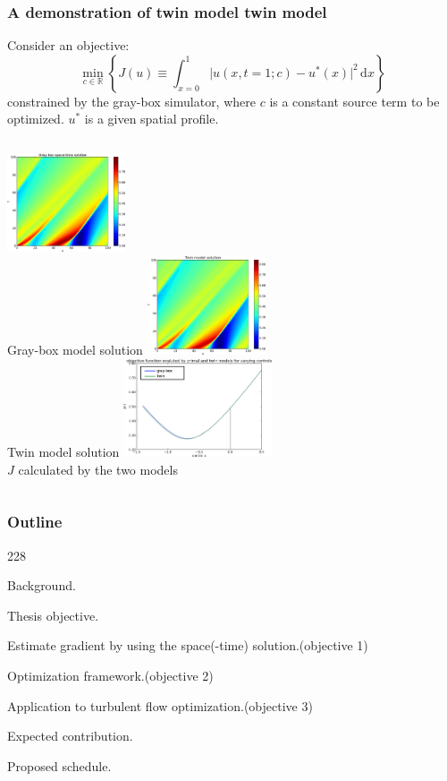 \documentclass{beamer}
\let\oldcite=\cite
\renewcommand{\cite}[1]{\textcolor[rgb]{.4,.4,.85}{\oldcite{#1}}}
\newcommand{\barrow}{\item[\color{darkred}\ding{228}]}
\begin{document}
\begin{frame}
    \frametitle{A demonstration of twin model \hfill \scriptsize{twin model}}\small
    Consider an objective: \scriptsize \cite{Kucuk 06}\vspace{-.2cm}\small
    $$
        \min_{c\in\mathbb{R}} \left\{ J(u) \equiv \int_{x=0}^1 \big|u(x,t=1;c) - u^*(x)\big|^2 \,\textrm{d}x\right\}
    $$
    constrained by the gray-box simulator, where $c$ is a constant source term to be optimized.
    $u^*$ is a given spatial profile.\\\vspace{.2cm}
    \scriptsize
    \begin{columns}
         \centering
            \includegraphics[width=3.5cm]{leftcol.png}\\
            Gray-box model solution
         \centering
            \includegraphics[width=3.5cm]{Twin_sol_30.png}\\
            Twin model solution
         \centering
            \includegraphics[width=4.4cm]{J_twin_vs_primal.png}\\
            $J$ calculated by the two models
    \end{columns}
\end{frame}


\begin{frame}
    \frametitle{Outline}\small
    \begin{dinglist}{228}
        \barrow {} Background.
        \barrow Thesis objective.
        \vspace{.35cm}
        \barrow Estimate gradient by using the space(-time) solution.\hfill(objective 1)
        \barrow Optimization framework.\hfill(objective 2)
        \barrow Application to turbulent flow optimization.\hfill(objective 3)
        \vspace{.35cm}
        \barrow Expected contribution.
        \barrow Proposed schedule.
    \end{dinglist}
\end{frame}
\end{document}
